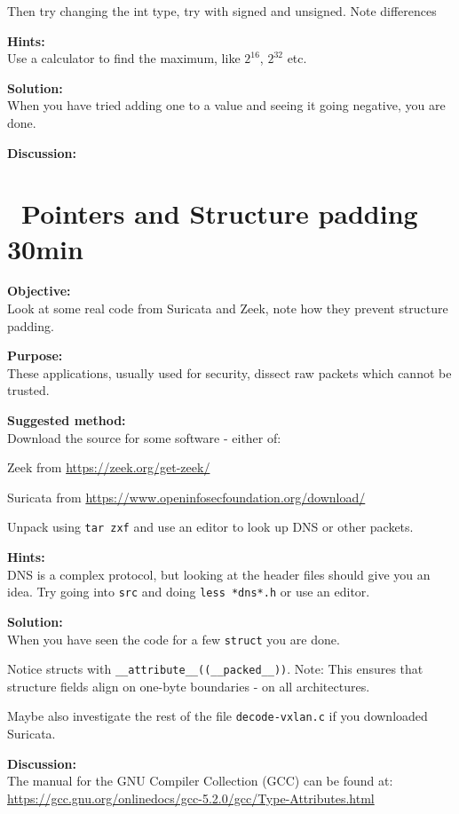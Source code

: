 \documentclass[a4paper,11pt,notitlepage]{report}
\begin{document}
Then try changing the int type, try with signed and unsigned. Note differences

{\bf Hints:}\\
Use a calculator to find the maximum, like $2^{16}$, $2^{32}$ etc.

{\bf Solution:}\\
When you have tried adding one to a value and seeing it going negative, you are done.

{\bf Discussion:}\\


\chapter{\faExclamationTriangle\ Pointers and Structure padding 30min}
\label{ex:structure-padding}

{\bf Objective:}\\
Look at some real code from Suricata and Zeek, note how they prevent structure padding.

{\bf Purpose:}\\
These applications, usually used for security, dissect raw packets which cannot be trusted.

{\bf Suggested method:}\\
Download the source for some software - either of:
\begin{list2}
\item Zeek from \url{https://zeek.org/get-zeek/}
\item Suricata from \url{https://www.openinfosecfoundation.org/download/}
\end{list2}

Unpack using \verb+tar zxf+ and use an editor to look up DNS or other packets.

{\bf Hints:}\\
DNS is a complex protocol, but looking at the header files should give you an idea. Try going into \verb+src+ and doing \verb+less *dns*.h+ or use an editor.


{\bf Solution:}\\
When you have seen the code for a few \verb+struct+ you are done.

Notice structs with \verb+__attribute__((__packed__))+. Note: This ensures that structure fields align on one-byte boundaries - on all architectures.

Maybe also investigate the rest of the file \verb+decode-vxlan.c+ if you downloaded Suricata.

{\bf Discussion:}\\
The manual for the GNU Compiler Collection (GCC) can be found at:\\
\url{https://gcc.gnu.org/onlinedocs/gcc-5.2.0/gcc/Type-Attributes.html}
\end{document}
